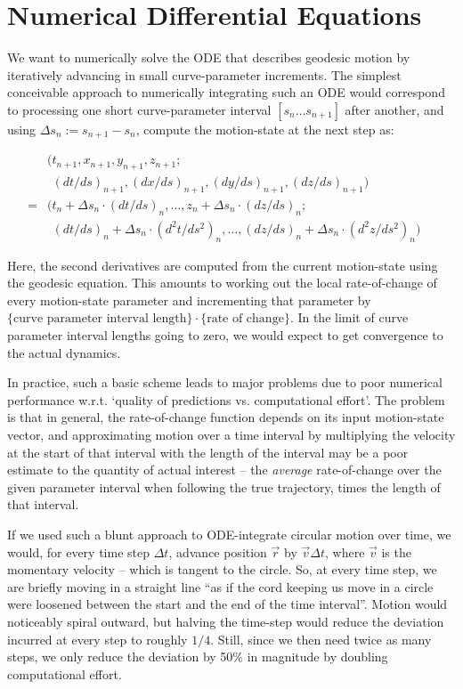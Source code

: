 \documentclass[twocolumn]{article}
\begin{document}
\section{Numerical Differential Equations}\label{sec:ode}

We want to numerically solve the ODE that describes geodesic motion by
iteratively advancing in small curve-parameter increments.
The simplest conceivable approach to numerically integrating such an ODE
would correspond to processing one short curve-parameter interval
\([s_n \ldots s_{n+1}]\) after another, and using
\(\Delta s_n:=s_{n+1}-s_n\), compute the motion-state at the next step
as:

\begin{strip}
\begin{equation}\begin{array}{lll}
&(t_{n+1},x_{n+1},y_{n+1},z_{n+1};\\
&\phantom((dt/ds)_{n+1},(dx/ds)_{n+1},(dy/ds)_{n+1},(dz/ds)_{n+1})\phantom)&\\
=&(t_n+\Delta s_n\cdot (dt/ds)_n,\ldots,z_n+\Delta s_n\cdot (dz/ds)_n;\\
 &\phantom((dt/ds)_n+\Delta s_n\cdot(d^2t/ds^2)_n,\ldots,
  (dz/ds)_n+\Delta s_n\cdot(d^2z/ds^2)_n)\phantom)
\end{array}
\end{equation}
\end{strip}

Here, the second derivatives are computed from the current motion-state
using the geodesic equation. This amounts to working out the local
rate-of-change of every motion-state parameter and incrementing that
parameter by
\(\{\text{curve parameter interval length}\}\cdot\{\text{rate of change}\}\).
In the limit of curve parameter interval lengths going to zero, we would
expect to get convergence to the actual dynamics.

In practice, such a basic scheme leads to major problems due to poor
numerical performance w.r.t. `quality of predictions vs. computational
effort'. The problem is that in general, the rate-of-change function
depends on its input motion-state vector, and approximating motion
over a time interval by multiplying the velocity at the start of that
interval with the length of the interval may be a poor estimate to the
quantity of actual interest -- the \emph{average} rate-of-change over
the given parameter interval when following the true trajectory, times
the length of that interval.

If we used such a blunt approach to ODE-integrate circular motion over time,
we would, for every time step \(\Delta t\), advance position \(\vec r\)
by \(\vec v\Delta t\), where \(\vec v\) is the momentary velocity --
which is tangent to the circle. So, at every time step, we are briefly
moving in a straight line ``as if the cord keeping us move in a circle
were loosened between the start and the end of the time interval''.
Motion would noticeably spiral outward, but halving the time-step would
reduce the deviation incurred at every step to roughly \(1/4\). Still,
since we then need twice as many steps, we only reduce the deviation by
50\% in magnitude by doubling computational effort.
\end{document}
